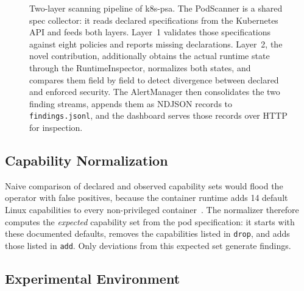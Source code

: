 \documentclass[sigconf]{acmart}
\begin{document}
\begin{figure}[htbp]
{%
}
\caption{Two-layer scanning pipeline of k8s-psa. The PodScanner is a shared spec collector: it reads declared specifications from the Kubernetes API and feeds both layers. Layer~1 validates those specifications against eight policies and reports missing declarations. Layer~2, the novel contribution, additionally obtains the actual runtime state through the RuntimeInspector, normalizes both states, and compares them field by field to detect divergence between declared and enforced security. The AlertManager then consolidates the two finding streams, appends them as NDJSON records to \texttt{findings.jsonl}, and the dashboard serves those records over HTTP for inspection.}
\label{fig:pipeline}
\end{figure}

\subsection{Capability Normalization}

Naive comparison of declared and observed capability sets would flood the operator with false positives, because the container runtime adds 14 default Linux capabilities to every non-privileged container~\cite{dockerseccomp2024}. The normalizer therefore computes the \emph{expected} capability set from the pod specification: it starts with these documented defaults, removes the capabilities listed in \texttt{drop}, and adds those listed in \texttt{add}. Only deviations from this expected set generate findings.

\subsection{Experimental Environment}
\label{sec:env}
\end{document}
